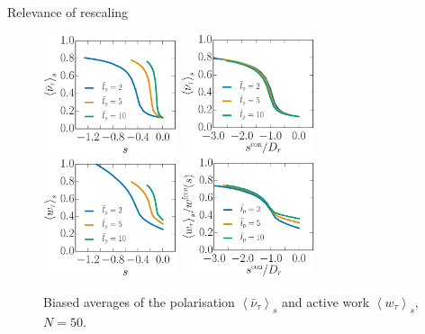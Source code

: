 \documentclass{beamer}
\begin{document}
\begin{frame}{Relevance of rescaling}

\vspace{-5pt}
\begin{figure}
\centering
\includegraphics[width=0.35\textwidth]{sOrder_s_Nm5000_Dk6500_To1000.eps}
\includegraphics[width=0.35\textwidth]{sOrder_Nm5000_Dk6500_To1000-con.eps}\\
\includegraphics[width=0.35\textwidth]{sWork_s_Nm5000_Dk6500_To1000.eps}
\includegraphics[width=0.35\textwidth]{sWork_Nm5000_Dk6500_To1000-con.eps}
\vspace{-5pt}
\caption{Biased averages of the polarisation $\left<\bar{\nu}_{\tau}\right>_s$ and active work $\left<w_{\tau}\right>_s$, $N = 50$. }
\end{figure}

\end{frame}
\end{document}
